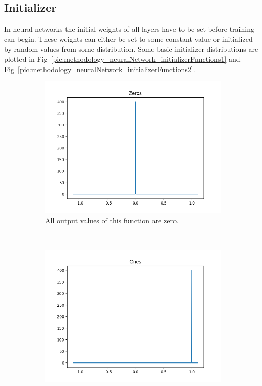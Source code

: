 \newpage

\subsection{Initializer}
In neural networks the initial weights of all layers have to be set before training can begin. These weights can either be set to some constant value or initialized by random values from some distribution. Some basic initializer distributions are plotted in Fig~\ref{pic:methodology_neuralNetwork_initializerFunctions1} and Fig~\ref{pic:methodology_neuralNetwork_initializerFunctions2}.

\begin{figure}[h!]
	\centering
	\begin{subfigure}[t]{0.4\textwidth}
		\centering
		\includegraphics[width=\textwidth]{img/methodology_neuralNetwork_initializerFunctions_zeros.png}
		\caption{All output values of this function are zero.}
	\end{subfigure}%
	~ 
	\begin{subfigure}[t]{0.4\textwidth}
		\centering
		\includegraphics[width=\textwidth]{img/methodology_neuralNetwork_initializerFunctions_ones.png}

\end{subfigure}
\end{figure}
